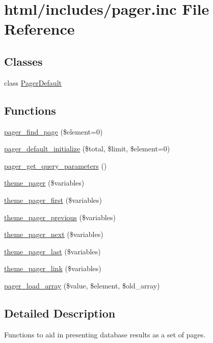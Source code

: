 \hypertarget{pager_8inc}{
\section{html/includes/pager.inc File Reference}
\label{pager_8inc}
}
\subsection*{Classes}
\begin{DoxyCompactItemize}
\item 
class \hyperlink{classPagerDefault}{PagerDefault}
\end{DoxyCompactItemize}
\subsection*{Functions}
\begin{DoxyCompactItemize}
\item 
\hyperlink{pager_8inc_a7c4b7f1b30cc884b4823937ac86c71d5}{pager\_\-find\_\-page} (\$element=0)
\item 
\hyperlink{pager_8inc_a8e8fe141a61ed070df4145bee4ec5571}{pager\_\-default\_\-initialize} (\$total, \$limit, \$element=0)
\item 
\hyperlink{pager_8inc_a72b73df2a968faea00b27cdae0c8ee87}{pager\_\-get\_\-query\_\-parameters} ()
\item 
\hyperlink{group__themeable_ga3bfc8e62230af3fb60b061ee67c6d045}{theme\_\-pager} (\$variables)
\item 
\hyperlink{group__themeable_gaffa784c4dec5d4263179d003782aeb4d}{theme\_\-pager\_\-first} (\$variables)
\item 
\hyperlink{group__themeable_gae703c543e6dbae14df5da1451d6eaf03}{theme\_\-pager\_\-previous} (\$variables)
\item 
\hyperlink{group__themeable_ga36f1c652a53b2d4df284cdae21dc87a0}{theme\_\-pager\_\-next} (\$variables)
\item 
\hyperlink{group__themeable_ga906e18f1c174adbec2076cc886f8a102}{theme\_\-pager\_\-last} (\$variables)
\item 
\hyperlink{group__themeable_ga1f17f9bb29c5c0d1b58ff4cba8e2499a}{theme\_\-pager\_\-link} (\$variables)
\item 
\hyperlink{pager_8inc_a0f82d7cb1702f6d160285903378a9919}{pager\_\-load\_\-array} (\$value, \$element, \$old\_\-array)
\end{DoxyCompactItemize}


\subsection{Detailed Description}
Functions to aid in presenting database results as a set of pages. 

